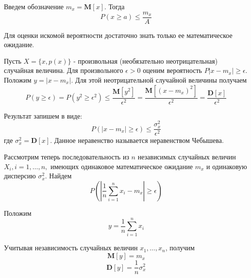\documentclass[14pt]{article}
\begin{document}
Введем обозначение \(m_x = \textbf{M}[x]\). Тогда \\
\begin{displaymath}
    P(x \geq a) \leq \frac{m_x}{A}
\end{displaymath}

Для оценки искомой вероятности достаточно знать только ее математическое ожидание.

Пусть \(X = \{x, p(x)\}\) - произвольная (необязательно неотрицательная) случайная величина. Для произвольного \( \epsilon > 0 \) оценим вероятность \( P|x - m_x| \geq \epsilon \). \\

Положим \(y = |x - m_x|\). Для этой неотрицательной случайной величины получаем
\begin{displaymath}
    P(y \geq \epsilon) = P(y^2 \geq \epsilon^2) \leq \frac{\textbf{M}[y^2]}{\epsilon^2} = \frac{\textbf{M}[(x - m_x)^2]}{\epsilon^2} = \frac{\textbf{D}[x]}{\epsilon^2}
\end{displaymath}

Результат запишем в виде: \\
\begin{displaymath}
    P(|x - m_x| \geq \epsilon) \leq \frac{\sigma_x^2}{\epsilon^2}
\end{displaymath}
где \(\sigma_x^2 = \textbf{D}[x]\). Данное неравенство называется неравенством Чебышева.

Рассмотрим теперь последовательность из \(n\) независимых случайных величин \(X_i, i = 1,\ldots,n,\) имеющих одинаковое математическое ожидание \(m_x\) и одинаковую дисперсию \(\sigma_x^2\). Найдем \\
\begin{displaymath}
    P(|\frac{1}{n}\sum_{i=1}^{n} x_i - m_x| \geq \epsilon)
\end{displaymath}

Положим \\
\begin{displaymath}
    y = \frac{1}{n}\sum_{i=1}^{n} x_i
\end{displaymath}

Учитывая независимость случайных величин \(x_1,\ldots,x_n\), получим \\
\begin{displaymath}
    \textbf{M}[y] = m_x
\end{displaymath}
\begin{displaymath}
    \textbf{D}[y] = \frac{1}{n}\sigma_x^2
\end{displaymath}
\end{document}
